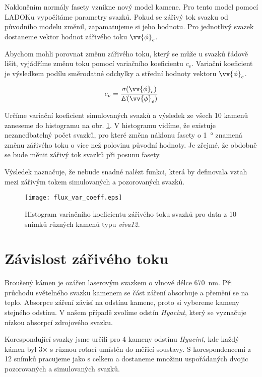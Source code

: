 	Nakloněním normály fasety vznikne nový model kamene. Pro tento model pomocí LADOKu  vypočítáme parametry svazků. Pokud se zářivý tok svazku od původního modelu změnil, zapamatujeme si jeho hodnotu. Pro jednotlivý svazek dostaneme vektor hodnot zá\-ři\-vé\-ho toku $\vv{\phi}_e$. 
	
	 Abychom mohli porovnat změnu zářivého toku, který se může u svazků řádově lišit, vyjádříme změnu toku pomocí variačního koeficientu $c_v$. Variační koeficient je výsledkem podílu směrodatné odchylky a střední hodnoty vektoru $\vv{\phi}_e$. 
	 
	 \begin{equation}	 
	 c_v = \frac{\sigma(\vv{\phi}_e)}{E(\vv{\phi}_e)}
	 \end{equation}
	 
Určíme variační koeficient simulovaných svazků a výsledek ze všech 10 kamenů zaneseme do histogramu na obr. \ref{fig: flux_var_coeff}. V histogramu vidíme, že existuje nezanedbatelný počet svazků, pro které změna náklonu fasety o \SI{1}{\degree} znamená změnu zářivého toku o více než polovinu původní hodnoty. Je zřejmé, že obdobně se bude měnit zářivý tok svazků při posunu fasety. 

 Výsledek naznačuje, že nebude snadné nalézt funkci, která by definovala vztah mezi zářivým tokem simulovaných a pozorovaných svazků.  

\begin{figure}[htps]
\centering
\texttt{[image: flux\_var\_coeff.eps]}
\caption{Histogram variačního koeficientu zářivého toku svazků pro data z 10 snímků různých kamenů typu \textit{viva12}.}
\label{fig: flux_var_coeff}
\end{figure}



\section{Závislost zářivého toku}
\label{sec: tok_zavislost}
	Broušený kámen je ozářen laserovým svazkem o vlnové délce \SI{670}{\nano\metre}. Při průchodu svě\-tel\-né\-ho svazku kamenem se část záření absorbuje a přemění se na teplo. Absorpce záření závisí na odstínu kamene, proto si vybereme kameny stejného odstínu. V našem případě zvolíme odstín \textit{Hyacint}, který se vyznačuje nízkou absorpcí zdrojového svazku. 
	
	Korespondující svazky jsme určili pro 4 kameny odstínu \textit{Hyacint}, kde každý kámen byl 3$\times$ s různou rotací umístěn do měřicí soustavy. S korespondencemi z 12 snímků pracujeme jako s celkem a dostaneme množinu uspořádaných dvojic pozorovaných a simulovaných svazků. 
	
